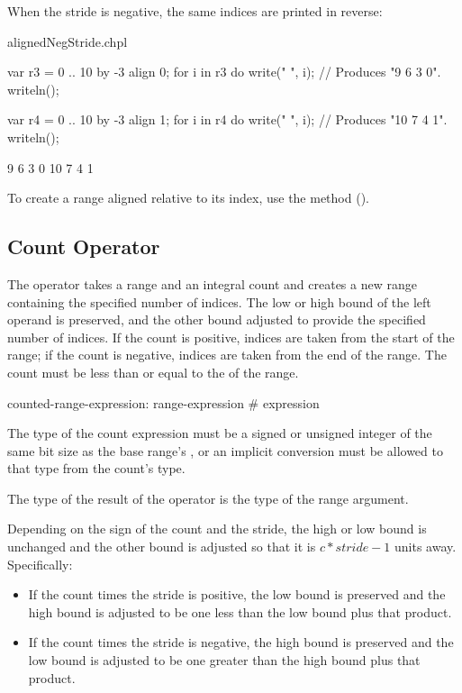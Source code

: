 When the stride is negative, the same indices are printed in reverse:
\begin{chapelexample}{alignedNegStride.chpl}
\begin{chapel}
var r3 = 0 .. 10 by -3 align 0;
for i in r3 do
  write(" ", i);			// Produces "9 6 3 0".
writeln();

var r4 = 0 .. 10 by -3 align 1;
for i in r4 do
  write(" ", i);			// Produces "10 7 4 1".
writeln();
\end{chapel}
\begin{chapeloutput}
 9 6 3 0
 10 7 4 1
\end{chapeloutput}
\end{chapelexample}

To create a range aligned relative to its  index, use
the  method ().


\subsection{Count Operator}
\label{Count_Operator}

The \chpl{#} operator takes a range and an integral count and creates a new
range containing the specified number of indices.  The low or high bound of the
left operand is preserved, and the other bound adjusted to provide the specified
number of indices.  If the count is positive, indices are taken from the start
of the range; if the count is negative, indices are taken from the end of the
range.  The count must be less than or equal to the  of the range.

\begin{syntax}
counted-range-expression:
  range-expression # expression
\end{syntax}

The type of the count expression must be a signed or unsigned integer
of the same bit size as the base range's , or an
implicit conversion must be allowed to that type from the count's
type.

The type of the result of the \chpl{#} operator is the type of the
range argument.

Depending on the sign of the count and the stride, the high or low bound is
unchanged and the other bound is adjusted so that it is $c * stride - 1$ units
away.  Specifically:
\begin{itemize}
\item If the count times the stride is positive, the low bound is preserved
and the high bound is adjusted to be one less than the low bound plus that
product.
\item If the count times the stride is negative, the high bound is preserved
and the low bound is adjusted to be one greater than the high bound plus that
product.
\end{itemize}

